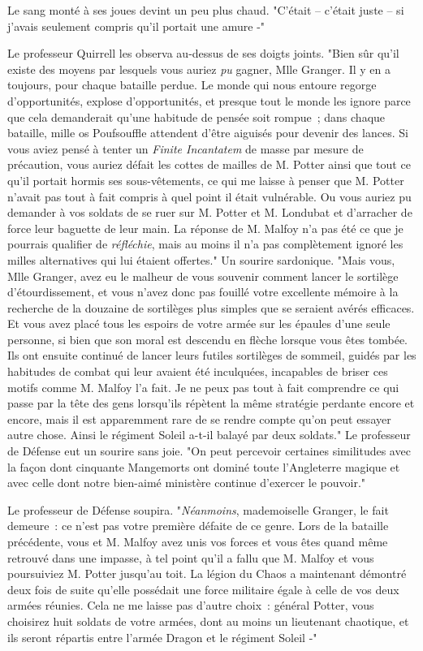 Le sang monté à ses joues devint un peu plus chaud. "C'était -- c'était juste -- si j'avais seulement compris qu'il portait une amure -"

Le professeur Quirrell les observa au-dessus de ses doigts joints. "Bien sûr qu'il existe des moyens par lesquels vous auriez \emph{pu} gagner, Mlle Granger. Il y en a toujours, pour chaque bataille perdue. Le monde qui nous entoure regorge d'opportunités, explose d'opportunités, et presque tout le monde les ignore parce que cela demanderait qu'une habitude de pensée soit rompue~; dans chaque bataille, mille os Poufsouffle attendent d'être aiguisés pour devenir des lances. Si vous aviez pensé à tenter un \emph{Finite Incantatem} de masse par mesure de précaution, vous auriez défait les cottes de mailles de M. Potter ainsi que tout ce qu'il portait hormis ses sous-vêtements, ce qui me laisse à penser que M. Potter n'avait pas tout à fait compris à quel point il était vulnérable. Ou vous auriez pu demander à vos soldats de se ruer sur M. Potter et M. Londubat et d'arracher de force leur baguette de leur main. La réponse de M. Malfoy n'a pas été ce que je pourrais qualifier de \emph{réfléchie}, mais au moins il n'a pas complètement ignoré les milles alternatives qui lui étaient offertes." Un sourire sardonique. "Mais vous, Mlle Granger, avez eu le malheur de vous souvenir comment lancer le sortilège d'étourdissement, et vous n'avez donc pas fouillé votre excellente mémoire à la recherche de la douzaine de sortilèges plus simples que se seraient avérés efficaces. Et vous avez placé tous les espoirs de votre armée sur les épaules d'une seule personne, si bien que son moral est descendu en flèche lorsque vous êtes tombée. Ils ont ensuite continué de lancer leurs futiles sortilèges de sommeil, guidés par les habitudes de combat qui leur avaient été inculquées, incapables de briser ces motifs comme M. Malfoy l'a fait. Je ne peux pas tout à fait comprendre ce qui passe par la tête des gens lorsqu'ils répètent la même stratégie perdante encore et encore, mais il est apparemment rare de se rendre compte qu'on peut essayer autre chose. Ainsi le régiment Soleil a-t-il balayé par deux soldats." Le professeur de Défense eut un sourire sans joie. "On peut percevoir certaines similitudes avec la façon dont cinquante Mangemorts ont dominé toute l'Angleterre magique et avec celle dont notre bien-aimé ministère continue d'exercer le pouvoir."

Le professeur de Défense soupira. "\emph{Néanmoins}, mademoiselle Granger, le fait demeure~: ce n'est pas votre première défaite de ce genre. Lors de la bataille précédente, vous et M. Malfoy avez unis vos forces et vous êtes quand même retrouvé dans une impasse, à tel point qu'il a fallu que M. Malfoy et vous poursuiviez M. Potter jusqu'au toit. La légion du Chaos a maintenant démontré deux fois de suite qu'elle possédait une force militaire égale à celle de vos deux armées réunies. Cela ne me laisse pas d'autre choix~: général Potter, vous choisirez huit soldats de votre armées, dont au moins un lieutenant chaotique, et ils seront répartis entre l'armée Dragon et le régiment Soleil -"

